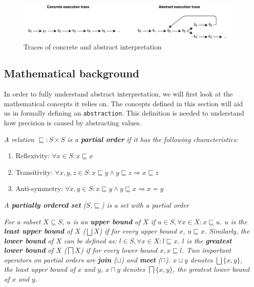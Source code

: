 \begin{figure}[!h]
    \centering
      \includegraphics[width=1.0\textwidth]{images/abstractInterpretation} 
      \caption{Traces of concrete and abstract interpretation}
    \label{fig:abstractInterpretation}
\end{figure}


\subsection{Mathematical background}
\label{subsec:lattice}

In order to fully understand abstract interpretation, we will first look at the mathematical concepts it relies on. The concepts defined in this section will aid us in formally defining an \texttt{abstraction}. This definition is needed to understand how precision is caused by abstracting values.

\begin{definition}
\textit{A relation $\sqsubseteq: S \times S$ is a \textbf{partial order} if it has the following characteristics:}
\begin{enumerate}
\item Reflexivity: $\forall x \in S : x \sqsubseteq x$
\item Transitivity:  $\forall x,y,z \in S : x \sqsubseteq y \wedge y \sqsubseteq z \Rightarrow x \sqsubseteq z$
\item Anti-symmetry: $\forall x,y \in S : x \sqsubseteq y \wedge y \sqsubseteq x \Rightarrow x = y$
\end{enumerate}
\end{definition}
\begin{definition}
\textit{A \textbf{partially ordered set} ($S$,$\sqsubseteq$) is a set with a partial order}
\end{definition}
\begin{definition}
\textit{For a subset $X \subseteq S$, $u$ is an \textbf{upper bound} of $X$ if $u\in S, \forall x \in X: x \sqsubseteq u$. $u$ is the \textbf{least upper bound} of $X$ ($\bigsqcup X$) if for every upper bound $x$, $u \sqsubseteq x$. Similarly, the \textbf{lower bound} of $X$ can be defined as: $l \in S,\forall x \in X: l \sqsubseteq x$. $l$ is the \textbf{greatest lower bound} of $X$ ($\bigsqcap X$) if for every lower bound $x, x \sqsubseteq l$. Two important operators on partial orders are \textbf{join} ($\sqcup$) and \textbf{meet} ($\sqcap$). $x \sqcup y$ denotes $\bigsqcup\{x,y\}$, the least upper bound of $x$ and $y$, $x \sqcap y$ denotes $\bigsqcap\{x,y\}$, the greatest lower bound of $x$ and $y$.}
\end{definition}

